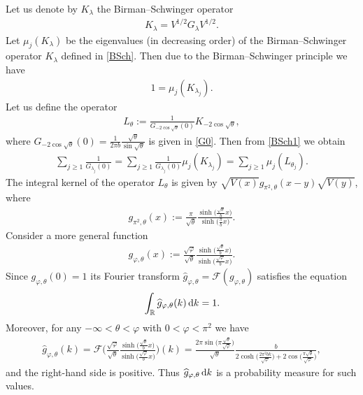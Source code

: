 \documentclass[pdftex]{sigma}%
\numberwithin{equation}{section}
\begin{document}
Let us denote by $K_\lambda$ the Birman--Schwinger operator
\begin{gather}\label{BSch}
K_\lambda = V^{1/2} G_\lambda V^{1/2}.
\end{gather}
Let $\mu_j(K_\lambda)$ be the eigenvalues (in decreasing order) of the Birman--Schwinger operator $K_\lambda$ defined in \eqref{BSch}.
Then due to the Birman--Schwinger principle we have
\begin{gather}\label{BSch1}
1 = \mu_j(K_{\lambda_j}).
\end{gather}
Let us define the operator
\begin{gather*}%
L_{\theta}:=\frac{1}{G_{-2\cos\sqrt{\theta}}(0)} K_{-2\cos\sqrt{\theta}} ,
\end{gather*}
where $G_{-2\cos\sqrt{\theta}}(0) =\frac{1}{2\pi b}\frac{\sqrt{\theta}}{\sin\sqrt{\theta}}$ is given in \eqref{G0}.
Then from \eqref{BSch1} we obtain
\begin{gather*}
\sum_{j\ge 1} \frac{1}{G_{\lambda_j}(0)}
=\sum_{j\ge 1} \frac{1}{G_{\lambda_j}(0)} \mu_j(K_{\lambda_j})=\sum_{j\ge 1}\mu_j(L_{\theta_j}).
\end{gather*}
The integral kernel of the operator $L_\theta$ is given by $\sqrt{V(x)}g_{\pi^2,\theta}(x-y)\sqrt{V(y)}$, where
\begin{gather*}
g_{\pi^2,\theta}(x):=
\frac{\pi}{\sqrt{\theta}}\frac{\sinh \big(\frac{\sqrt{\theta}}{b}x\big)}{\sinh \big(\frac{\pi}{b}x\big)}.
\end{gather*}
Consider a more general function
\begin{gather*}
g_{\varphi,\theta}(x):=
\frac{\sqrt\varphi}{\sqrt{\theta}}\frac{\sinh \big(\frac{\sqrt{\theta}}{b}x\big)}{\sinh \big(\frac{\sqrt\varphi}{b}x\big)}.
\end{gather*}
Since $g_{\varphi,\theta}(0)=1$ its Fourier transform
$\widehat{g}_{\varphi,\theta} = \mathcal{F} (g_{\varphi,\theta})$ satisfies the equation
\begin{gather*}
\int_{\mathbb R} \widehat{g}_{\varphi,\theta}(k) \, {\rm d} k = 1.
\end{gather*}
Moreover, for any $-\infty<\theta <\varphi$ with $0<\varphi <\pi^2$ we have
\begin{gather*}
 \widehat{g}_{\varphi,\theta}(k) = \mathcal{F} \Bigg(\frac{\sqrt\varphi}{\sqrt{\theta}} \frac{\sinh\big(\frac{\sqrt{\theta}}{b}x\big)}{\sinh\big(\frac{\sqrt\varphi}{b}x\big)}\Bigg)(k)
 = \frac{2\pi \sin\big(\pi \frac{\sqrt\theta}{\sqrt\varphi}\big)}{\sqrt\theta} \frac{b}{2\cosh \big(\frac{2\pi^2 b k}{\sqrt\varphi}\big) + 2\cos\big(\frac{\pi\sqrt\theta}{\sqrt\varphi}\big)},
\end{gather*}
and the right-hand side is positive. Thus $\widehat{g}_{\varphi,\theta}\, {\rm d} k$ is a probability measure for such values.
\end{document}
